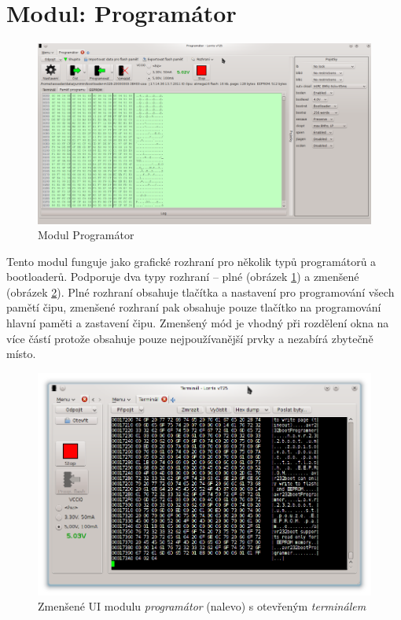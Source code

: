 \documentclass[12pt, a4paper, oneside]{article}
\newcommand{\It}{\textit}  %
\begin{document}
\section{Modul: Programátor}
\begin{figure}[H]
\begin{center}
\includegraphics[width=\textwidth]{img/programmer.png}
\caption{Modul Programátor}
\label{prog_full}
\end{center}
\end{figure}

Tento modul funguje jako grafické rozhraní pro několik typů programátorů a bootloaderů. Podporuje dva typy rozhraní -- plné (obrázek \ref{prog_full}) a zmenšené (obrázek \ref{prog_mini}). Plné rozhraní obsahuje tlačítka a nastavení pro programování všech pamětí čipu, zmenšené rozhraní pak obsahuje pouze tlačítko na programování hlavní paměti a zastavení čipu. Zmenšený mód je vhodný při rozdělení okna na více částí protože obsahuje pouze nejpoužívanější prvky a nezabírá zbytečně místo.

\begin{figure}[H]
\begin{center}
\includegraphics[width=\textwidth]{img/programmer_mini.png}
\caption{Zmenšené UI modulu \It{programátor} (nalevo) s otevřeným \It{terminálem}}
\label{prog_mini}
\end{center}
\end{figure}
\end{document}
